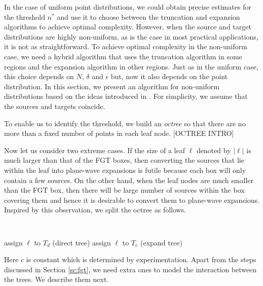 
In the case of uniform point distributions, we could obtain precise estimates for the threshold $n^*$ and use it to 
 choose between the truncation and expansion algorithms to achieve optimal complexity. However, when the source and 
 target distributions are highly non-uniform, as is the case in most practical applications, it is not as
 straightforward. To achieve optimal complexity in the non-uniform case, we need a hybrid algorithm that uses
 the truncation algorithm in some regions and the expansion algorithm in other regions. Just as in the uniform case,
 this choice depends on $N$, $\delta$ and $\epsilon$ but, now it also depends on the point distribution. In this section, 
 we present an algorithm for non-uniform distributions based on the ideas introduced in \cite{veerapaneni08}. For simplicity, we
 assume that the sources and targets coincide. 
 
 To enable us to identify the threshold, we build an {\em octree} so that there are no more than a fixed number of points in each leaf node. [OCTREE INTRO]

%

Now let us consider two extreme cases. If the size of a leaf $\ell$ denoted by $|\ell|$ is much larger than that of the FGT boxes, 
then converting the sources that lie within the leaf into plane-wave expansions is futile because each box will only contain a few sources. On the other hand,
 when the leaf nodes are much smaller than the FGT box, then there will be large number of sources within the box covering them
  and hence it is desirable to convert them to plane-wave expansions. Inspired by this observation, we split the octree as follows. 

{\tt
\begin{algorithmic}
\STATE
          \STATE assign $\ell$ to $T_d$ (direct tree)
      \ELSE
          \STATE assign $\ell$ to $T_e$ (expand tree)
      \ENDIF
  \ENDFOR
\STATE
\end{algorithmic}
}

Here $c$ is constant which is determined by experimentation. Apart from the steps discussed in Section \ref{sc:fgt}, we
 need extra ones to model the interaction between the trees. We describe them next.  


